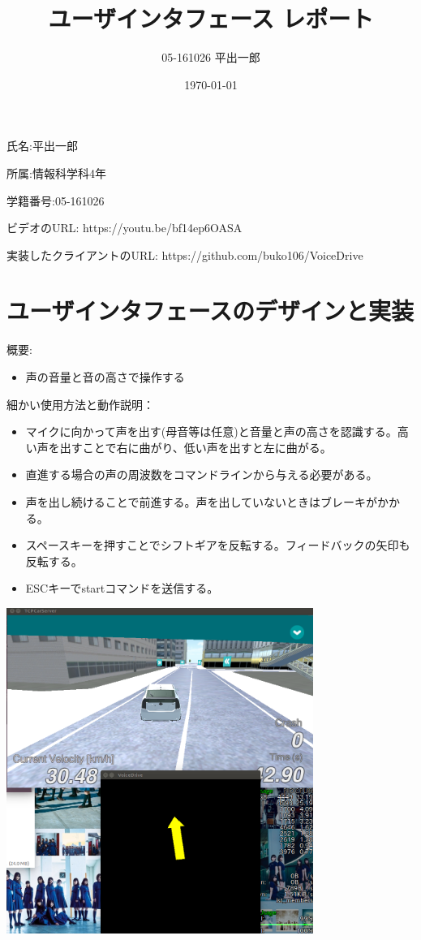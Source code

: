 \documentclass[a4j]{jarticle}
\title{ユーザインタフェース レポート}
\author{05-161026 平出一郎}
\date{\today}
\begin{document}
\thispagestyle{empty}
\maketitle
\pagebreak


氏名:平出一郎

所属:情報科学科4年

学籍番号:05-161026

ビデオのURL: https://youtu.be/bf14ep6OASA

実装したクライアントのURL: https://github.com/buko106/VoiceDrive

\section{ユーザインタフェースのデザインと実装}

概要:
\begin{itemize}
\item 声の音量と音の高さで操作する
\end{itemize}

細かい使用方法と動作説明：　

\begin{itemize}
\item マイクに向かって声を出す(母音等は任意)と音量と声の高さを認識する。高い声を出すことで右に曲がり、低い声を出すと左に曲がる。
\item 直進する場合の声の周波数をコマンドラインから与える必要がある。
\item 声を出し続けることで前進する。声を出していないときはブレーキがかかる。
\item スペースキーを押すことでシフトギアを反転する。フィードバックの矢印も反転する。
\item ESCキーでstartコマンドを送信する。
\end{itemize}

\includegraphics[width=10cm]{captureVoiceDrive.png}
\end{document}
